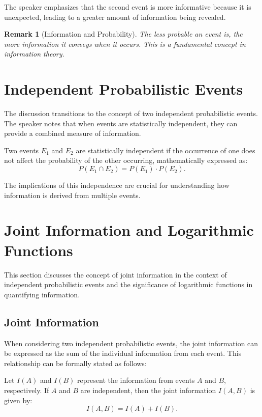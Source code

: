 \documentclass[12pt,a4paper]{article}
\newenvironment{thmbox}[1][]{%
  \begin{tcolorbox}[enhanced, breakable, colback=thmcolor, colframe=blue!50!black, title=#1, fonttitle=\bfseries, arc=3pt, boxrule=0.5pt]
}{\end{tcolorbox}}
\newenvironment{defbox}[1][]{%
  \begin{tcolorbox}[enhanced, breakable, colback=defcolor, colframe=green!50!black, title=#1, fonttitle=\bfseries, arc=3pt, boxrule=0.5pt]
}{\end{tcolorbox}}
\newtheorem{remark}{Remark}[section]
\begin{document}
The speaker emphasizes that the second event is more informative because it is unexpected, leading to a greater amount of information being revealed.

\begin{remark}[Information and Probability]
The less probable an event is, the more information it conveys when it occurs. This is a fundamental concept in information theory.
\end{remark}

\section{Independent Probabilistic Events}
The discussion transitions to the concept of two independent probabilistic events. The speaker notes that when events are statistically independent, they can provide a combined measure of information.

\begin{defbox}[Statistical Independence]
Two events \(E_1\) and \(E_2\) are statistically independent if the occurrence of one does not affect the probability of the other occurring, mathematically expressed as:
\[
P(E_1 \cap E_2) = P(E_1) \cdot P(E_2).
\]
\end{defbox}

The implications of this independence are crucial for understanding how information is derived from multiple events.

\section{Joint Information and Logarithmic Functions}
This section discusses the concept of joint information in the context of independent probabilistic events and the significance of logarithmic functions in quantifying information.

\subsection{Joint Information}
When considering two independent probabilistic events, the joint information can be expressed as the sum of the individual information from each event. This relationship can be formally stated as follows:

\begin{thmbox}[Joint Information]
Let \( I(A) \) and \( I(B) \) represent the information from events \( A \) and \( B \), respectively. If \( A \) and \( B \) are independent, then the joint information \( I(A, B) \) is given by:
\[
I(A, B) = I(A) + I(B).
\]
\end{thmbox}
\end{document}
